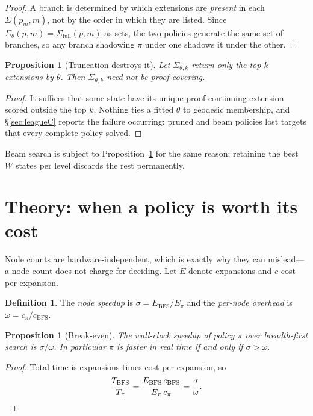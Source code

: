 \documentclass[11pt]{article}
\theoremstyle{plain}
\newtheorem{proposition}[theorem]{Proposition}
\theoremstyle{definition}
\newtheorem{definition}[theorem]{Definition}
\theoremstyle{remark}
\newcommand{\Sig}{\Sigma}
\begin{document}
\begin{proof}
A branch is determined by which extensions are \emph{present} in each
$\Sig(p_m,m)$, not by the order in which they are listed. Since
$\Sig_\theta(p,m) = \Sig_{\mathrm{full}}(p,m)$ as sets, the two policies generate
the same set of branches, so any branch shadowing $\pi$ under one shadows it
under the other.
\end{proof}

\begin{proposition}[Truncation destroys it]
\label{prop:prune}
Let $\Sig_{\theta,k}$ return only the top $k$ extensions by $\theta$. Then
$\Sig_{\theta,k}$ need not be proof-covering.
\end{proposition}

\begin{proof}
It suffices that some state have its unique proof-continuing extension scored
outside the top $k$. Nothing ties a fitted $\theta$ to geodesic membership, and
\S\ref{sec:leagueC} reports the failure occurring: pruned and beam policies lost
targets that every complete policy solved.
\end{proof}

Beam search is subject to Proposition~\ref{prop:prune} for the same reason:
retaining the best $W$ states per level discards the rest permanently.

\section{Theory: when a policy is worth its cost}

Node counts are hardware-independent, which is exactly why they can mislead---a
node count does not charge for deciding. Let $E$ denote expansions and $c$ cost
per expansion.

\begin{definition}
The \emph{node speedup} is $\sigma = E_{\mathrm{BFS}} / E_{\pi}$ and the
\emph{per-node overhead} is $\omega = c_{\pi} / c_{\mathrm{BFS}}$.
\end{definition}

\begin{proposition}[Break-even]
\label{prop:breakeven}
The wall-clock speedup of policy $\pi$ over breadth-first search is
$\sigma / \omega$. In particular $\pi$ is faster in real time if and only if
$\sigma > \omega$.
\end{proposition}

\begin{proof}
Total time is expansions times cost per expansion, so
\[
\frac{T_{\mathrm{BFS}}}{T_{\pi}}
= \frac{E_{\mathrm{BFS}}\, c_{\mathrm{BFS}}}{E_{\pi}\, c_{\pi}}
= \frac{\sigma}{\omega}. \qedhere
\]
\end{proof}
\end{document}
